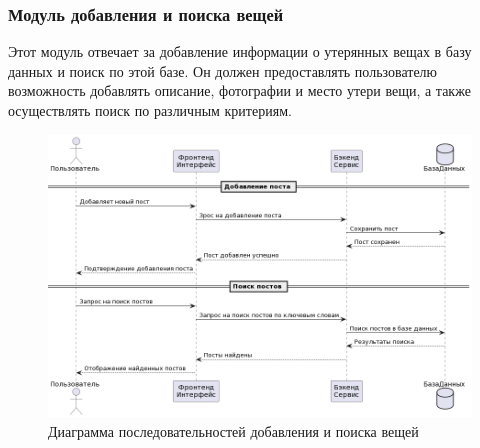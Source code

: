 \subsubsection{Модуль добавления и поиска вещей}

Этот модуль отвечает за добавление информации о утерянных вещах в базу данных и поиск по этой базе. Он должен предоставлять пользователю возможность добавлять описание, фотографии и место утери вещи, а также осуществлять поиск по различным критериям.

\begin{figure}[htb]
	\centering
	\includegraphics[width=.9\textwidth]{images/seach-diagram.png}
	\parskip=6pt
	\caption{Диаграмма последовательностей добавления и поиска вещей}
	\label{fig:searchDiagram}
\end{figure}

